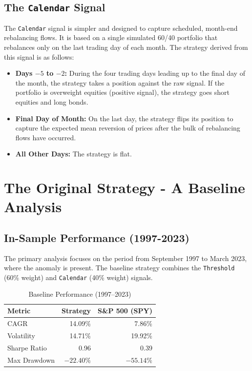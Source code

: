 \documentclass{article}
\begin{document}
\subsection{The \texttt{Calendar} Signal}
The \texttt{Calendar} signal is simpler and designed to capture scheduled, month-end rebalancing flows. It is based on a single simulated 60/40 portfolio that rebalances only on the last trading day of each month. The strategy derived from this signal is as follows:
\begin{itemize}
    \item \textbf{Days $-5$ to $-2$:} During the four trading days leading up to the final day of the month, the strategy takes a position against the raw signal. If the portfolio is overweight equities (positive signal), the strategy goes short equities and long bonds.
    \item \textbf{Final Day of Month:} On the last day, the strategy flips its position to capture the expected mean reversion of prices after the bulk of rebalancing flows have occurred.
    \item \textbf{All Other Days:} The strategy is flat.
\end{itemize}

\section{The Original Strategy - A Baseline Analysis}

\subsection{In-Sample Performance (1997-2023)}
The primary analysis focuses on the period from September 1997 to March 2023, where the anomaly is present. The baseline strategy combines the \texttt{Threshold} (60\% weight) and \texttt{Calendar} (40\% weight) signals.

\begin{table}[htbp]
\centering
\caption{Baseline Performance (1997--2023)}
\begin{tabular}{lrr}
\toprule
\textbf{Metric} & \textbf{Strategy} & \textbf{S\&P 500 (SPY)} \\
\midrule
CAGR           & 14.09\%   & 7.86\%         \\
Volatility     & 14.71\%   & 19.92\%        \\
Sharpe Ratio   & 0.96     & 0.39          \\
Max Drawdown   & $-22.40$\%  & $-55.14$\%       \\
\bottomrule
\end{tabular}
\end{table}
\end{document}
